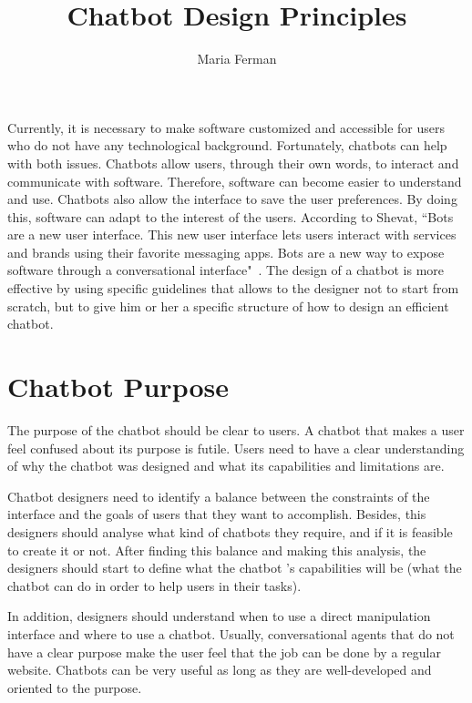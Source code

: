 \documentclass[a4paper,10pt]{article}
\title{Chatbot Design Principles}
\author{Maria Ferman}
\begin{document}
\maketitle
Currently, it is necessary to make software customized and accessible for users who do not have any technological background. Fortunately, chatbots can help with both issues. Chatbots allow users, through their own words, to interact and communicate with software. Therefore, software can become easier to understand and use. Chatbots also allow the interface to save the user preferences. By doing this, software can adapt to the interest of the users. According to Shevat,  ``Bots are a new user interface. This new user interface lets users interact with services and brands using their favorite messaging apps. Bots are a new way to expose software through a conversational interface"~\cite{Shevat2017}. 
The design of a chatbot is more effective by using specific guidelines that allows to the designer not to start from scratch, but to give him or her a specific structure of how to design an efficient chatbot. 

\section{Chatbot Purpose}

The purpose of the chatbot should be clear to users. A chatbot that makes a user feel confused about its purpose is futile. Users need to have a clear understanding of why the chatbot was designed and what its capabilities and limitations are. 

Chatbot designers need to identify a balance between the constraints of the interface and the goals of users that they want to accomplish. Besides, this designers should analyse what kind of chatbots they require, and if it is feasible to create it or not. After finding this balance and making this analysis, the designers should start to define what the chatbot 's capabilities will be (what the chatbot can do in order to help users in their tasks). 

In addition, designers should understand when to use a direct manipulation interface and where to use a chatbot. Usually, conversational agents that do not have a clear purpose make the user feel that the job can be done by a regular website. Chatbots can be very useful as long as they are well-developed and oriented to the purpose. %
\end{document}
